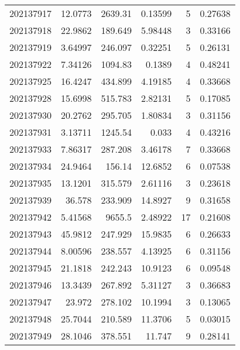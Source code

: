 \begin{tabular}{rrrrrr}
 202137917 &         12.0773  &     2639.31   &            0.13599 &           5 & 0.27638 \\
 202137918 &         22.9862  &      189.649  &            5.98448 &           3 & 0.33166 \\
 202137919 &          3.64997 &      246.097  &            0.32251 &           5 & 0.26131 \\
 202137922 &          7.34126 &     1094.83   &            0.1389  &           4 & 0.48241 \\
 202137925 &         16.4247  &      434.899  &            4.19185 &           4 & 0.33668 \\
 202137928 &         15.6998  &      515.783  &            2.82131 &           5 & 0.17085 \\
 202137930 &         20.2762  &      295.705  &            1.80834 &           3 & 0.31156 \\
 202137931 &          3.13711 &     1245.54   &            0.033   &           4 & 0.43216 \\
 202137933 &          7.86317 &      287.208  &            3.46178 &           7 & 0.33668 \\
 202137934 &         24.9464  &      156.14   &           12.6852  &           6 & 0.07538 \\
 202137935 &         13.1201  &      315.579  &            2.61116 &           3 & 0.23618 \\
 202137939 &         36.578   &      233.909  &           14.8927  &           9 & 0.31658 \\
 202137942 &          5.41568 &     9655.5    &            2.48922 &          17 & 0.21608 \\
 202137943 &         45.9812  &      247.929  &           15.9835  &           6 & 0.26633 \\
 202137944 &          8.00596 &      238.557  &            4.13925 &           6 & 0.31156 \\
 202137945 &         21.1818  &      242.243  &           10.9123  &           6 & 0.09548 \\
 202137946 &         13.3439  &      267.892  &            5.31127 &           3 & 0.36683 \\
 202137947 &         23.972   &      278.102  &           10.1994  &           3 & 0.13065 \\
 202137948 &         25.7044  &      210.589  &           11.3706  &           5 & 0.03015 \\
 202137949 &         28.1046  &      378.551  &           11.747   &           9 & 0.28141 \\

\end{tabular}
